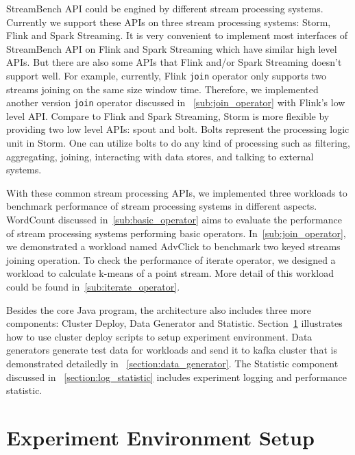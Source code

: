 StreamBench API could be engined by different stream processing systems. Currently we support these APIs on three stream processing systems: Storm, Flink and Spark Streaming. It is very convenient to implement most interfaces of StreamBench API on Flink and Spark Streaming which have similar high level APIs. But there are also some APIs that Flink and/or Spark Streaming doesn't support well. For example, currently, Flink \texttt{join} operator only supports two streams joining on the same size window time. Therefore, we implemented another version \texttt{join} operator discussed in ~\cref{sub:join_operator} with Flink's low level API. Compare to Flink and Spark Streaming, Storm is more flexible by providing two low level APIs: spout and bolt. Bolts represent the processing logic unit in Storm. One can utilize bolts to do any kind of processing such as filtering, aggregating, joining, interacting with data stores, and talking to external systems.

With these common stream processing APIs, we implemented three workloads to benchmark performance of stream processing systems in different aspects. WordCount discussed in~\cref{sub:basic_operator} aims to evaluate the performance of stream processing systems performing basic operators. In~\cref{sub:join_operator}, we demonstrated a workload named AdvClick to benchmark two keyed streams joining operation. To check the performance of iterate operator, we designed a workload to calculate k-means of a point stream. More detail of this workload could be found in~\cref{sub:iterate_operator}.

Besides the core Java program, the architecture also includes three more components: Cluster Deploy, Data Generator and Statistic. Section~\ref{chapter:environment_setup} illustrates how to use cluster deploy scripts to setup experiment environment. Data generators generate test data for workloads and send it to kafka cluster that is demonstrated detailedly in ~\cref{section:data_generator}. The Statistic component discussed in ~\cref{section:log_statistic} includes experiment logging and performance statistic. 


\section{Experiment Environment Setup}
\label{chapter:environment_setup}

